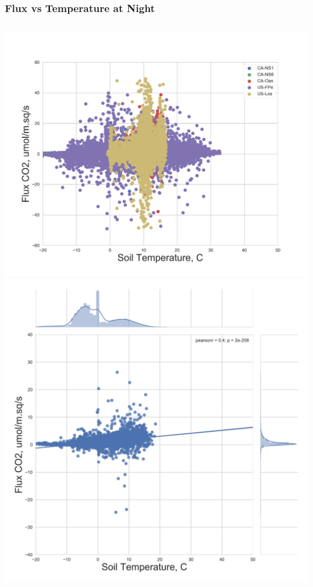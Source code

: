 \documentclass{beamer}
\begin{document}
\begin{frame}
\frametitle{Flux vs Temperature at Night}

\begin{columns}[t]
\centering
\includegraphics[width=\textwidth]{FvsT_night/all.png}\\
\includegraphics[width=\textwidth]{FvsT_night/CA-NS1.png}

\end{columns}
\end{frame}
\end{document}
